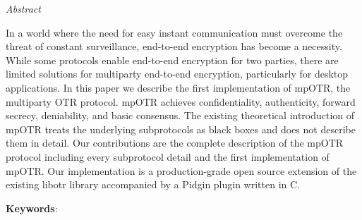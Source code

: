 \documentclass[
11pt, %
english, %
singlespacing, %
parskip, %
headsepline, %
]{MastersDoctoralThesis} %
\begin{document}

\thispagestyle{plain}
\begin{center}
  {\huge\textit{Abstract} \par}
  \bigskip
\end{center}

In a world where the need for easy instant communication must overcome the threat of constant surveillance, end-to-end encryption has become a necessity.
While some protocols enable end-to-end encryption for two parties, there are limited solutions for multiparty end-to-end encryption, particularly for desktop applications.
In this paper we describe the first implementation of mpOTR, the multiparty OTR protocol.
mpOTR achieves confidentiality, authenticity, forward secrecy, deniability, and basic consensus.
The existing theoretical introduction of mpOTR treats the underlying subprotocols as black boxes and does not describe them in detail.
Our contributions are the complete description of the mpOTR protocol including every subprotocol detail and the first implementation of mpOTR.
Our implementation is a production-grade open source extension of the existing libotr library accompanied by a Pidgin plugin written in C.

  \vspace*{\fill}

{\bf Keywords}: \keywordnames


\cleardoublepage
\end{document}
